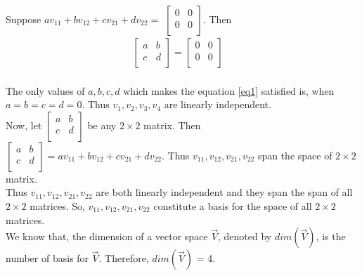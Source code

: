 \documentclass[journal,12pt,twocolumn]{IEEEtran}
\begin{document}
	Suppose $av_{11} + bv_{12} + cv_{21} + dv_{22} = $ $\begin{bmatrix}
		0 & 0 \\
		0 & 0 \\
	\end{bmatrix}.$ Then \\
	
	\begin{align}\label{eq1}
		\begin{bmatrix}
			a & b \\
			c & d \\
		\end{bmatrix} = 
		\begin{bmatrix}
			0 & 0 \\
			0 & 0 \\
		\end{bmatrix}
		\quad 
	\end{align}\\
	
	The only values of $a, b, c, d$ which makes the equation \ref{eq1} satisfied is, when $a=b=c=d=0$. Thus $v_1, v_2, v_3, v_4$ are linearly independent.\\
	
	Now, let $\begin{bmatrix}
		a & b \\
		c & d \\
	\end{bmatrix}$ be any $2\times 2$ matrix. Then $\begin{bmatrix}
		a & b \\
		c & d \\
	\end{bmatrix} = av_{11} + bv_{12} + cv_{21} + dv_{22}.$ Thus $v_{11}, v_{12}, v_{21}, v_{22}$ span the space of $2\times 2$ matrix.\\
	
	Thus $v_{11}, v_{12}, v_{21}, v_{22}$ are both linearly independent and they span the span of all $2\times 2$ matrices. So, $v_{11}, v_{12}, v_{21}, v_{22}$ constitute a basis for the space of all $2\times 2$ matrices. \\
	
	We know that, the dimension of a vector space $\vec{V}$, denoted by $dim(\vec{V})$, is the number of basis for $\vec{V}$. Therefore, $dim(\vec{V})$ = 4.
	
\end{document}
